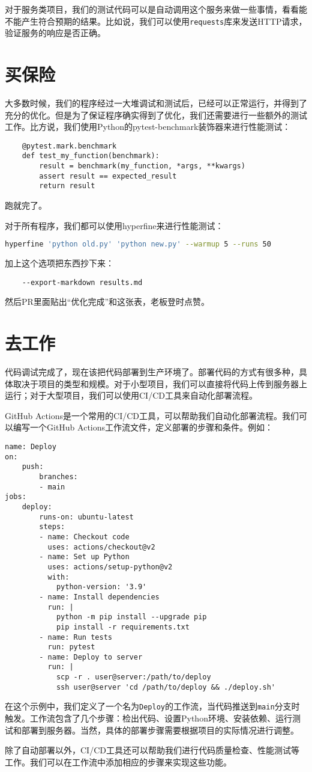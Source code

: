 \documentclass[../main.tex]{subfiles}
\begin{document}
对于服务类项目，我们的测试代码可以是自动调用这个服务来做一些事情，看看能不能产生符合预期的结果。比如说，我们可以使用\texttt{requests}库来发送HTTP请求，验证服务的响应是否正确。

\section{买保险}

大多数时候，我们的程序经过一大堆调试和测试后，已经可以正常运行，并得到了充分的优化。但是为了保证程序确实得到了优化，我们还需要进行一些额外的测试工作。比方说，我们使用Python的pytest-benchmark装饰器来进行性能测试：
\begin{lstlisting}
    @pytest.mark.benchmark
    def test_my_function(benchmark):
        result = benchmark(my_function, *args, **kwargs)
        assert result == expected_result
        return result
\end{lstlisting}
跑就完了。

对于所有程序，我们都可以使用hyperfine来进行性能测试：
\begin{lstlisting}[language=bash]
    hyperfine 'python old.py' 'python new.py' --warmup 5 --runs 50
\end{lstlisting}
加上这个选项把东西抄下来：
\begin{lstlisting}
    --export-markdown results.md
\end{lstlisting}
然后PR里面贴出“优化完成”和这张表，老板登时点赞。

\section{去工作}

代码调试完成了，现在该把代码部署到生产环境了。部署代码的方式有很多种，具体取决于项目的类型和规模。对于小型项目，我们可以直接将代码上传到服务器上运行；对于大型项目，我们可以使用CI/CD工具来自动化部署流程。

GitHub Actions是一个常用的CI/CD工具，可以帮助我们自动化部署流程。我们可以编写一个GitHub Actions工作流文件，定义部署的步骤和条件。例如：
\begin{lstlisting}
name: Deploy
on:
    push:
        branches:
        - main
jobs:
    deploy:
        runs-on: ubuntu-latest
        steps:
        - name: Checkout code
          uses: actions/checkout@v2
        - name: Set up Python
          uses: actions/setup-python@v2
          with:
            python-version: '3.9'
        - name: Install dependencies
          run: |
            python -m pip install --upgrade pip
            pip install -r requirements.txt
        - name: Run tests
          run: pytest
        - name: Deploy to server
          run: |
            scp -r . user@server:/path/to/deploy
            ssh user@server 'cd /path/to/deploy && ./deploy.sh'
\end{lstlisting}
在这个示例中，我们定义了一个名为\texttt{Deploy}的工作流，当代码推送到\texttt{main}分支时触发。工作流包含了几个步骤：检出代码、设置Python环境、安装依赖、运行测试和部署到服务器。当然，具体的部署步骤需要根据项目的实际情况进行调整。

除了自动部署以外，CI/CD工具还可以帮助我们进行代码质量检查、性能测试等工作。我们可以在工作流中添加相应的步骤来实现这些功能。
\end{document}
